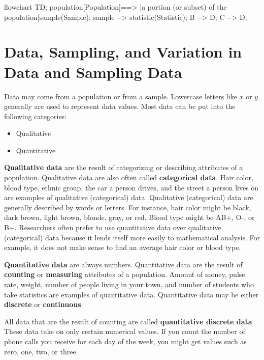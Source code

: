 \documentclass[
  letterpaper,
  DIV=11,
  numbers=noendperiod]{scrreprt}
\newenvironment{Shaded}{\begin{snugshade}}{\end{snugshade}}
\newcommand{\NormalTok}[1]{\textcolor[rgb]{0.00,0.23,0.31}{#1}}
\providecommand{\tightlist}{%
  \setlength{\itemsep}{0pt}\setlength{\parskip}{0pt}}\usepackage{longtable,booktabs,array}
\begin{document}
\begin{Shaded}
\begin{Highlighting}[]
\NormalTok{flowchart TD;}
\NormalTok{    population[Population]==\textgreater{} |a portion (or subset) of the population|sample(Sample);}
\NormalTok{    sample {-}{-}\textgreater{} statistic(Statistic);}
\NormalTok{    B {-}{-}\textgreater{} D;}
\NormalTok{    C {-}{-}\textgreater{} D;}
\end{Highlighting}
\end{Shaded}

\chapter{Data, Sampling, and Variation in Data and Sampling
Data}\label{data-sampling-and-variation-in-data-and-sampling-data}

Data may come from a population or from a sample. Lowercase letters like
\(x\) or \(y\) generally are used to represent data values. Most data
can be put into the following categories:

\begin{itemize}
\tightlist
\item
  Qualitative
\item
  Quantitative
\end{itemize}

\textbf{Qualitative data} are the result of categorizing or describing
attributes of a population. Qualitative data are also often called
\textbf{categorical data}. Hair color, blood type, ethnic group, the car
a person drives, and the street a person lives on are examples of
qualitative (categorical) data. Qualitative (categorical) data are
generally described by words or letters. For instance, hair color might
be black, dark brown, light brown, blonde, gray, or red. Blood type
might be AB+, O-, or B+. Researchers often prefer to use quantitative
data over qualitative (categorical) data because it lends itself more
easily to mathematical analysis. For example, it does not make sense to
find an average hair color or blood type.

\textbf{Quantitative data} are always numbers. Quantitative data are the
result of \textbf{counting} or \textbf{measuring} attributes of a
population. Amount of money, pulse rate, weight, number of people living
in your town, and number of students who take statistics are examples of
quantitative data. Quantitative data may be either \textbf{discrete} or
\textbf{continuous}.

All data that are the result of counting are called \textbf{quantitative
discrete data}. These data take on only certain numerical values. If you
count the number of phone calls you receive for each day of the week,
you might get values such as zero, one, two, or three.
\end{document}

